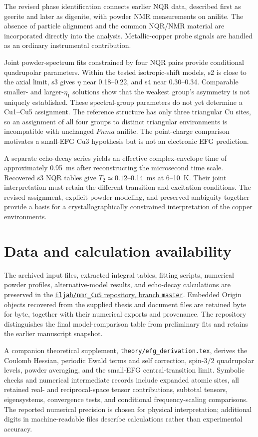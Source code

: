\documentclass[10pt,a4paper,twocolumn]{article}
\begin{document}
The revised phase identification connects earlier NQR data, described first as geerite and later as digenite, with powder NMR measurements on anilite. The absence of particle alignment and the common NQR/NMR material are incorporated directly into the analysis. Metallic-copper probe signals are handled as an ordinary instrumental contribution.

Joint powder-spectrum fits constrained by four NQR pairs provide conditional quadrupolar parameters. Within the tested isotropic-shift models, s2 is close to the axial limit, s3 gives $\eta$ near 0.18--0.22, and s4 near 0.30--0.34. Comparable smaller- and larger-$\eta_1$ solutions show that the weakest group's asymmetry is not uniquely established. These spectral-group parameters do not yet determine a Cu1--Cu5 assignment. The reference structure has only three triangular Cu sites, so an assignment of all four groups to distinct triangular environments is incompatible with unchanged $Pnma$ anilite. The point-charge comparison motivates a small-EFG Cu3 hypothesis but is not an electronic EFG prediction.

A separate echo-decay series yields an effective complex-envelope time of approximately 0.95~ms after reconstructing the microsecond time scale. Recovered s3 NQR tables give $T_2\simeq0.12$--0.14~ms at 6--10~K. Their joint interpretation must retain the different transition and excitation conditions. The revised assignment, explicit powder modeling, and preserved ambiguity together provide a basis for a crystallographically constrained interpretation of the copper environments.

\section*{Data and calculation availability}

The archived input files, extracted integral tables, fitting scripts, numerical powder profiles, alternative-model results, and echo-decay calculations are preserved in the \href{https://github.com/Eljah/nmr_CuS/tree/master}{\texttt{Eljah/nmr\_CuS} repository, branch \texttt{master}}. Embedded Origin objects recovered from the supplied thesis and document files are retained byte for byte, together with their numerical exports and provenance. The repository distinguishes the final model-comparison table from preliminary fits and retains the earlier manuscript snapshot.

A companion theoretical supplement, \texttt{theory/efg\_derivation.tex}, derives the Coulomb Hessian, periodic Ewald terms and self correction, spin-$3/2$ quadrupolar levels, powder averaging, and the small-EFG central-transition limit. Symbolic checks and numerical intermediate records include expanded atomic sites, all retained real- and reciprocal-space tensor contributions, subtotal tensors, eigensystems, convergence tests, and conditional frequency-scaling comparisons. The reported numerical precision is chosen for physical interpretation; additional digits in machine-readable files describe calculations rather than experimental accuracy.



\end{document}
